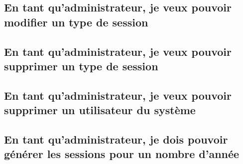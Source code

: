 	\newpage
	\subsection{En tant qu'administrateur, je veux pouvoir modifier un type de session}
		
	
	\subsection{En tant qu'administrateur, je veux pouvoir supprimer un type de session}
		
	
	\vspace{\baselineskip}
	\vspace{\baselineskip}
	\subsection{En tant qu'administrateur, je veux pouvoir supprimer un utilisateur du système}
		
	
	\newpage
	\subsection{En tant qu'administrateur, je dois pouvoir générer les sessions pour un nombre d'année}
		
